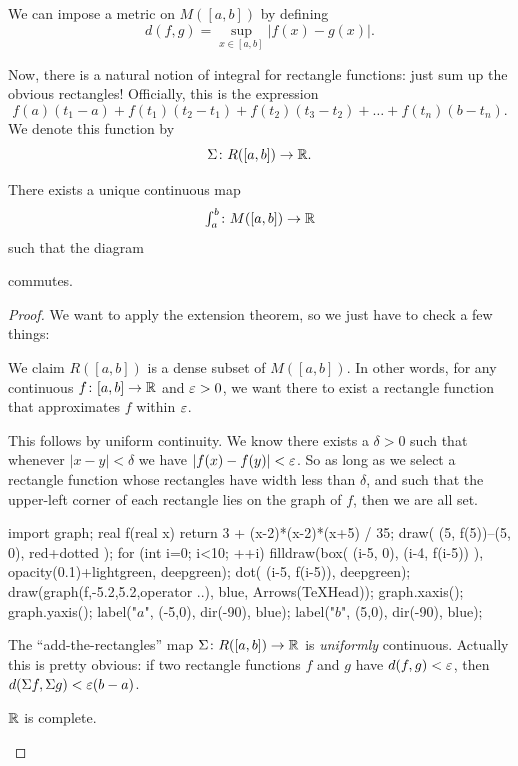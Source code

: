 \begin{definition}
	We can impose a metric on $M([a,b])$
	by defining
	\[ d(f,g) = \sup_{x \in [a,b]} \left\lvert f(x) - g(x) \right\rvert. \]
\end{definition}

Now, there is a natural notion of integral
for rectangle functions: just sum up the obvious rectangles!
Officially, this is the expression
\[ f(a)(t_1-a) + f(t_1)(t_2-t_1)
	+ f(t_2) \left( t_3 - t_2 \right)
	+ \dots + f(t_n) \left( b - t_n \right).  \]
We denote this function by
\[ \Sigma \colon R([a,b]) \to \mathbb R. \]

\begin{theorem}
	\label{thm:gaitsgory_riemann}
	There exists a unique continuous map
	\[ \textstyle{\int_a^b} \colon M([a,b]) \to \mathbb R \]
	such that the diagram
	\begin{center}
	\end{center}
	commutes.
\end{theorem}
\begin{proof}
	We want to apply the extension theorem,
	so we just have to check a few things:
	\begin{itemize}
		\ii We claim $R([a,b])$ is a dense subset of $M([a,b])$.
		In other words, for any continuous $f \colon [a,b] \to \mathbb R$
		and $\varepsilon > 0$,
		we want there to exist a rectangle function
		that approximates $f$ within $\varepsilon$.

		This follows by uniform continuity.
		We know there exists a $\delta > 0$ such
		that whenever $|x-y| < \delta$ we have $|f(x)-f(y)| < \varepsilon$.
		So as long as we select a rectangle function
		whose rectangles have width less than $\delta$,
		and such that the upper-left corner of each rectangle
		lies on the graph of $f$, then we are all set.

		\begin{center}
		\begin{asy}
			import graph;
			real f(real x) { return 3 + (x-2)*(x-2)*(x+5) / 35; }
			draw( (5, f(5))--(5, 0), red+dotted );
			for (int i=0; i<10; ++i) {
				filldraw(box( (i-5, 0), (i-4, f(i-5)) ),
					opacity(0.1)+lightgreen, deepgreen);
				dot( (i-5, f(i-5)), deepgreen);
			}
			draw(graph(f,-5.2,5.2,operator ..), blue, Arrows(TeXHead));
			graph.xaxis();
			graph.yaxis();
			label("$a$", (-5,0), dir(-90), blue);
			label("$b$", (5,0), dir(-90), blue);
		\end{asy}
		\end{center}


		\ii The ``add-the-rectangles'' map $\Sigma \colon R([a,b]) \to \mathbb R$
		is \emph{uniformly} continuous.
		Actually this is pretty obvious:
		if two rectangle functions $f$ and $g$
		have $d(f,g) < \varepsilon$,
		then $d(\Sigma f, \Sigma g) < \varepsilon(b-a)$.

		\ii $\mathbb R$ is complete.\qedhere
	\end{itemize}
\end{proof}

